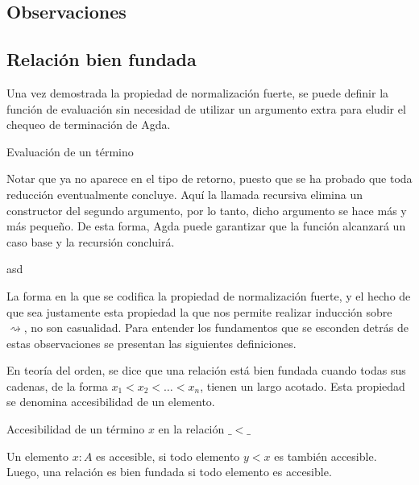 \subsection{Observaciones}

\subsection{Relación bien fundada}

Una vez demostrada la propiedad de normalización fuerte, se puede definir la función de evaluación sin necesidad de utilizar un argumento extra para eludir el chequeo de terminación de Agda.
  
\begin{codigo}
	Evaluación de un término
\end{codigo}

Notar que ya no aparece  en el tipo de retorno, puesto que se ha probado que toda reducción eventualmente concluye.
Aquí la llamada recursiva elimina un constructor  del segundo argumento, por lo tanto, dicho argumento se hace más y más pequeño.
De esta forma, Agda puede garantizar que la función alcanzará un caso base y la recursión concluirá.

\begin{example}
	asd
\end{example}

La forma en la que se codifica la propiedad de normalización fuerte, y el hecho de que sea justamente esta propiedad la que nos permite realizar inducción sobre $\rightsquigarrow$, no son casualidad.
Para entender los fundamentos que se esconden detrás de estas observaciones se presentan las siguientes definiciones.

En teoría del orden, se dice que una relación está bien fundada cuando todas sus cadenas, de la forma $x_1 < x_2 < \dots < x_n$, tienen un largo acotado.
Esta propiedad se denomina accesibilidad de un elemento.

\begin{codigo}
	Accesibilidad de un término $x$ en la relación $\_<\_$
\end{codigo}

Un elemento $x: A$ es accesible, si todo elemento $y < x$ es también accesible.
Luego, una relación es bien fundada si todo elemento es accesible.

